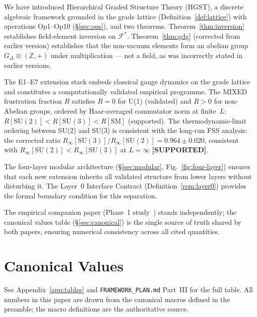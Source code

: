 \documentclass[12pt,a4paper]{article}
\theoremstyle{plain}
\theoremstyle{definition}
\theoremstyle{remark}
\newcommand{\RinfRatio}{0.964 \pm 0.020}                      %
\begin{document}
We have introduced Hierarchical Graded Structure Theory (HGST), a discrete
algebraic framework grounded in the grade lattice
(Definition~\ref{def:lattice}) with operations Op1--Op10 (\S\ref{sec:ops}),
and two theorems.
Theorem~\ref{thm:inversion} establishes field-element inversion on
$\mathcal{F}^*$.
Theorem~\ref{thm:gdg} (corrected from earlier version) establishes that the non-vacuum
elements form an abelian group $G_\Delta\cong(\mathbb{Z},+)$ under
multiplication --- not a field, as was incorrectly stated in earlier versions.

The E1--E7 extension stack embeds classical gauge dynamics on the grade lattice
and constitutes a computationally validated empirical programme.
The MIXED frustration fraction $R$ satisfies $R=0$ for U(1)
(validated) and $R>0$ for non-Abelian groups, ordered by
Haar-averaged commutator norm at finite~$L$:
$R[\mathrm{SU}(2)] < R[\mathrm{SU}(3)] < R[\mathrm{SM}]$ (supported).
The thermodynamic-limit ordering between SU(2) and SU(3) is
consistent with the long-run FSS analysis: the corrected ratio
$R_\infty[\mathrm{SU}(3)]/R_\infty[\mathrm{SU}(2)] = \RinfRatio$,
consistent with $R_\infty[\mathrm{SU}(2)] < R_\infty[\mathrm{SU}(3)]$ at $L=\infty$ \textbf{[SUPPORTED]}.



The four-layer modular architecture (\S\ref{sec:modular},
Fig.~\ref{fig:four-layer}) ensures that each new extension inherits all
validated structure from lower layers without disturbing it.
The Layer~0 Interface Contract (Definition~\ref{rem:layer0}) provides the formal
boundary condition for this separation.

The empirical companion paper (Phase~1 study~\cite{EmpiricalCompanion}) stands
independently; the canonical values table (\S\ref{sec:canonical}) is the
single source of truth shared by both papers, ensuring numerical consistency
across all cited quantities.


\section*{Canonical Values}
\label{sec:canonical}

See Appendix~\ref{app:tables} and \texttt{FRAMEWORK\_PLAN.md} Part~III for
the full table. All numbers in this paper are drawn from the canonical macros
defined in the preamble; the macro definitions are the authoritative source.
\end{document}
